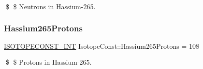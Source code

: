 \$ \$ Neutrons in Hassium-\/265. \mbox{\label{group___isotope_const-_hassium-_hs265_ga2ff5e3e7cc4fe86aecf062a8abd44e63}} 
\subsubsection{\texorpdfstring{Hassium265\+Protons}{Hassium265Protons}}
{\footnotesize\ttfamily \mbox{\hyperlink{group___isotope_const-_macros_ga5f18360b3e99483a35c32d789e62621c}{I\+S\+O\+T\+O\+P\+E\+C\+O\+N\+S\+T\+\_\+\+I\+NT}} Isotope\+Const\+::\+Hassium265\+Protons = 108}

\$ \$ Protons in Hassium-\/265. 